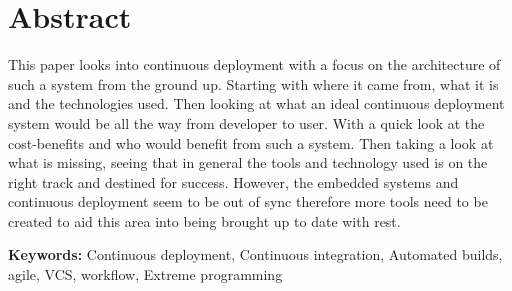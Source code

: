 %
%
%
%
%
%

\section*{\centering Abstract}

This paper looks into continuous deployment with a focus on the architecture of such a system from the ground up. Starting with where it came from, what it is and the technologies used. Then looking at what an ideal continuous deployment system would be all the way from developer to user. With a quick look at the cost-benefits and who would benefit from such a system. Then taking a look at what is missing, seeing that in general the tools and technology used is on the right track and destined for success. However, the embedded systems and continuous deployment seem to be out of sync therefore more tools need to be created to aid this area into being brought up to date with rest.

\vspace{1.5cm}

\textbf{Keywords:} Continuous deployment, Continuous integration, Automated builds, agile, VCS, workflow, Extreme programming 